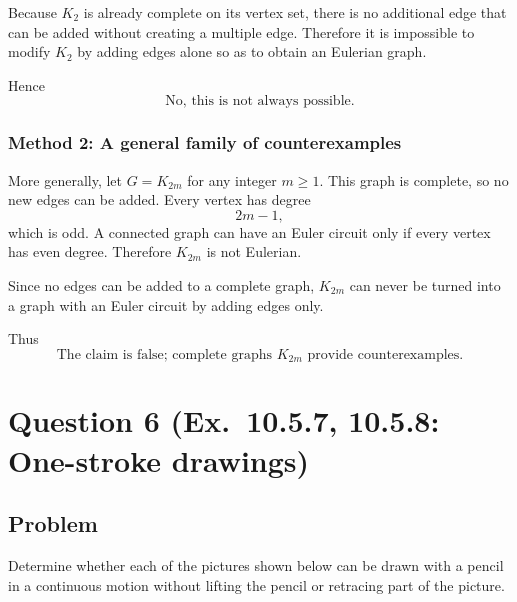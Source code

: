 \documentclass[12pt]{article}
\begin{document}
Because \(K_2\) is already complete on its vertex set, there is no additional edge that can be added without creating a multiple edge. Therefore it is impossible to modify \(K_2\) by adding edges alone so as to obtain an Eulerian graph.

Hence
\[
\boxed{\text{No, this is not always possible.}}
\]

\subsubsection{Method 2: A general family of counterexamples}
More generally, let \(G=K_{2m}\) for any integer \(m\ge 1\). This graph is complete, so no new edges can be added. Every vertex has degree
\[
2m-1,
\]
which is odd. A connected graph can have an Euler circuit only if every vertex has even degree. Therefore \(K_{2m}\) is not Eulerian.

Since no edges can be added to a complete graph, \(K_{2m}\) can never be turned into a graph with an Euler circuit by adding edges only.

Thus
\[
\boxed{\text{The claim is false; complete graphs }K_{2m}\text{ provide counterexamples.}}
\]

\newpage

\section{Question 6 (Ex.\ 10.5.7, 10.5.8: One-stroke drawings)}

\subsection{Problem}
Determine whether each of the pictures shown below can be drawn with a pencil in a continuous motion without lifting the pencil or retracing part of the picture.

\begin{center}
\begin{minipage}{0.35\textwidth}
\centering
{}
\end{minipage}
\hfill
\begin{minipage}{0.45\textwidth}
\centering
{}
\end{minipage}
\end{center}
\end{document}
